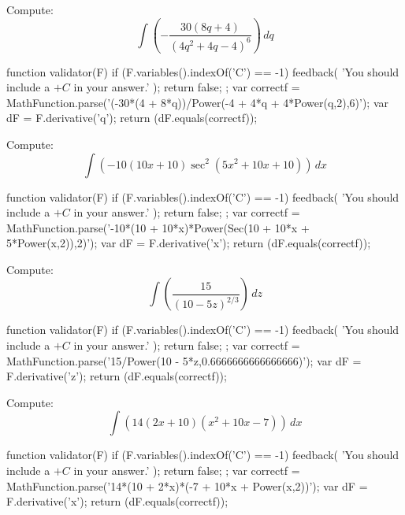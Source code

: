 \documentclass{ximera}
\renewcommand{\d}{\, d}
\begin{document}
\begin{exercise}
Compute: 
\[
\int \left(-\frac{30 (8 q+4)}{\left(4 q^2+4 q-4\right)^6}\right)\d q
\]
\begin{expressionAnswer}
     function validator(F) {
      if (F.variables().indexOf('C') == -1) {
        feedback( 'You should include a $+C$ in your answer.' );
        return false;
      };      
      var correctf = MathFunction.parse('(-30*(4 + 8*q))/Power(-4 + 4*q + 4*Power(q,2),6)');
      var dF = F.derivative('q');
      return (dF.equals(correctf));
    }
\end{expressionAnswer}
\end{exercise}



\begin{exercise}
Compute: 
\[
\int \left(-10 (10 x+10) \sec ^2\left(5 x^2+10 x+10\right)\right)\d x
\]
\begin{expressionAnswer}
     function validator(F) {
      if (F.variables().indexOf('C') == -1) {
        feedback( 'You should include a $+C$ in your answer.' );
        return false;
      };      
      var correctf = MathFunction.parse('-10*(10 + 10*x)*Power(Sec(10 + 10*x + 5*Power(x,2)),2)');
      var dF = F.derivative('x');
      return (dF.equals(correctf));
    }
\end{expressionAnswer}
\end{exercise}



\begin{exercise}
Compute: 
\[
\int \left(\frac{15}{(10-5 z)^{2/3}}\right)\d z
\]
\begin{expressionAnswer}
     function validator(F) {
      if (F.variables().indexOf('C') == -1) {
        feedback( 'You should include a $+C$ in your answer.' );
        return false;
      };      
      var correctf = MathFunction.parse('15/Power(10 - 5*z,0.6666666666666666)');
      var dF = F.derivative('z');
      return (dF.equals(correctf));
    }
\end{expressionAnswer}
\end{exercise}



\begin{exercise}
Compute: 
\[
\int \left(14 (2 x+10) \left(x^2+10 x-7\right)\right)\d x
\]
\begin{expressionAnswer}
     function validator(F) {
      if (F.variables().indexOf('C') == -1) {
        feedback( 'You should include a $+C$ in your answer.' );
        return false;
      };      
      var correctf = MathFunction.parse('14*(10 + 2*x)*(-7 + 10*x + Power(x,2))');
      var dF = F.derivative('x');
      return (dF.equals(correctf));
    }
\end{expressionAnswer}
\end{exercise}
\end{document}
